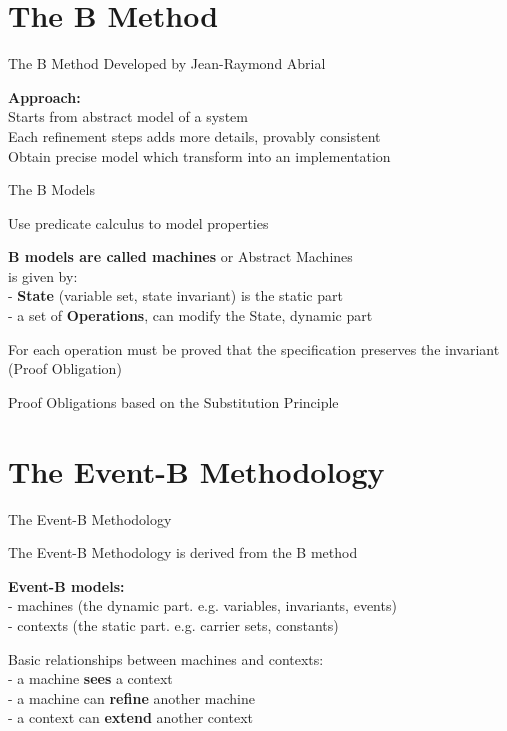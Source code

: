 \documentclass{beamer}
\begin{document}
  \section{The B Method}
  
  \begin{frame}{The B Method}
    Developed by Jean-Raymond Abrial

    \textbf{Approach:}\\
    Starts from abstract model of a system\\
    Each refinement steps adds more details, provably consistent\\
    Obtain precise model which transform into an implementation


  \end{frame}

  \begin{frame}{The B Models}

    Use predicate calculus to model properties

    \textbf{B models are called machines} or Abstract Machines\\
    is given by:\\
    - \textbf{State} (variable set, state invariant) is the static part\\
    - a set of \textbf{Operations}, can modify the State, dynamic part

    For each operation must be proved that the specification preserves the
    invariant (Proof Obligation)

    Proof Obligations based on the Substitution Principle

  \end{frame}

  \section{The Event-B Methodology}

  \begin{frame}{The Event-B Methodology}

    The Event-B Methodology is derived from the B method

    \textbf{Event-B models:}\\
    - machines (the dynamic part. e.g. variables, invariants, events)\\
    - contexts (the static part. e.g. carrier sets, constants)

    Basic relationships between machines and contexts:\\
    - a machine \textbf{sees} a context\\
    - a machine can \textbf{refine} another machine\\
    - a context can \textbf{extend} another context

  \end{frame}
\end{document}
